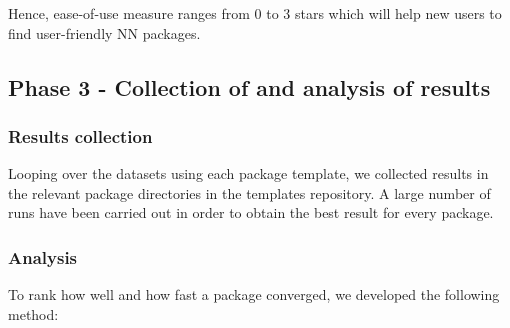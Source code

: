 Hence, ease-of-use measure ranges from 0 to 3 stars which will help new
users to find user-friendly NN packages.

\hypertarget{phase-3---collection-of-and-analysis-of-results}{%
\subsection{Phase 3 - Collection of and analysis of
results}\label{phase-3---collection-of-and-analysis-of-results}}

\hypertarget{results-collection}{%
\subsubsection{Results collection}\label{results-collection}}

Looping over the datasets using each package template, we collected
results in the relevant package directories in the templates repository.
A large number of runs have been carried out in order to obtain the best
result for every package.

\hypertarget{analysis}{%
\subsubsection{Analysis}\label{analysis}}

To rank how well and how fast a package converged, we developed the
following method:

